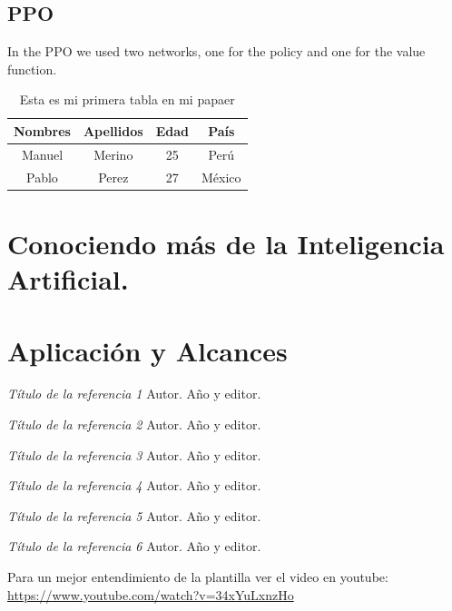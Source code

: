 \documentclass[10pt,a4paper]{article}
\newcommand{\celda}[1]{
	\begin{minipage}{2.5cm}
		\vspace{5mm}
		#1
		\vspace{5mm}
	\end{minipage}
}
\begin{document}
\begin{multicols}{2}
		\subsection{PPO}
		In the PPO we used two networks, one for the policy and one for the value function. 




			
		
	\end{multicols}
	
	\begin{table}[H]
		\centering
		\begin{tabular}{cccc}
			\hline
			\celda{Nombres} & \celda{Apellidos} & \celda{Edad} & \celda{País}\\
			\hline
			\celda{Manuel} & \celda{Merino} & \celda{25} & \celda{Perú}\\
			\hline
			\celda{Pablo} & \celda{Perez} & \celda{27} & \celda{México}\\
			\hline
		\end{tabular}
		\caption{Esta es mi primera tabla en mi papaer}
		\label{tb: Tabla1}
	\end{table}

	\begin{multicols}{2}
		\lipsum[1]
		\section{Conociendo más de la Inteligencia Artificial.}
			\lipsum
		
		\lipsum[2]
		
		\section{Aplicación y Alcances}
			\lipsum
			
	    \begin{thebibliography}{00}
	    
	        \newblock \textit{Título de la referencia 1}
	        \newblock Autor.
	        \newblock Año y editor.
	    
	        \newblock \textit{Título de la referencia 2}
	        \newblock Autor.
	        \newblock Año y editor.
	        
	        \newblock \textit{Título de la referencia 3}
	        \newblock Autor.
	        \newblock Año y editor.
	        
	        \newblock \textit{Título de la referencia 4}
	        \newblock Autor.
	        \newblock Año y editor.
	    
	        \newblock \textit{Título de la referencia 5}
	        \newblock Autor.
	        \newblock Año y editor.
	        
	        \newblock \textit{Título de la referencia 6}
	        \newblock Autor.
	        \newblock Año y editor.
	    
	    \end{thebibliography}
	\end{multicols}
	
	\vspace{3cm}
	Para un mejor entendimiento de la plantilla ver el video en youtube:\\
	
	\url{https://www.youtube.com/watch?v=34xYuLxnzHo}
	
	
\end{document}
